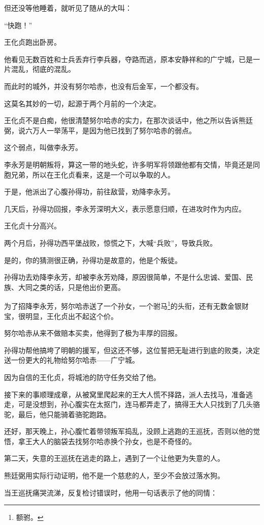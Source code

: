 \begin{multicols}{\theparacolNo}
但还没等他睡着，就听见了随从的大叫：

“快跑！”

王化贞跑出卧房。

他看见无数百姓和士兵丢弃行李兵器，夺路而逃，原本安静祥和的广宁城，已是一片混乱，彻底的混乱。

而此时的城外，并没有努尔哈赤，也没有后金军，一个都没有。

这莫名其妙的一切，起源于两个月前的一个决定。

王化贞不是白痴，他很清楚努尔哈赤的实力，在那次谈话中，他之所以告诉熊廷弼，说六万人一举荡平，是因为他已找到了努尔哈赤的弱点。

这个弱点，叫做李永芳。

李永芳是明朝叛将，算这一带的地头蛇，许多明军将领跟他都有交情，毕竟还是同胞兄弟，所以在王化贞看来，这是一个可以争取的人。

于是，他派出了心腹孙得功，前往敌营，劝降李永芳。

几天后，孙得功回报，李永芳深明大义，表示愿意归顺，在进攻时作为内应。

王化贞十分高兴。

两个月后，孙得功西平堡战败，惊慌之下，大喊“兵败”，导致兵败。

是的，你的猜测很正确，孙得功是故意的，他是个叛徒。

孙得功去劝降李永芳，却被李永芳劝降，原因很简单，不是什么忠诚、爱国、民族、大同之类的话，只是他出价更高。

为了招降李永芳，努尔哈赤送了一个孙女，一个驸马\footnote{额驸。}的头衔，还有无数金银财宝，很明显，王化贞出不起这个价。

努尔哈赤从来不做赔本买卖，他得到了极为丰厚的回报。

孙得功帮他搞垮了明朝的援军，但这还不够，这位誓把无耻进行到底的败类，决定送一份更大的礼物给努尔哈赤——广宁城。

因为自信的王化贞，将城池的防守任务交给了他。

接下来的事顺理成章，从被窝里爬起来的王大人慌不择路，派人去找马，准备逃走，可是没想到，孙心腹实在太抠门，连马都弄走了，搞得王大人只找到了几头骆驼，最后，他只能骑着骆驼跑路。

还好，那天晚上，孙心腹忙着带领叛军捣乱，没顾上逃跑的王巡抚，否则以他的觉悟，拿王大人的脑袋去找努尔哈赤换个孙女，也是不奇怪的。

第二天，失意的王巡抚在逃走的路上，遇到了一个让他更为失意的人。

熊廷弼用实际行动证明，他不是一个慈悲的人，至少不会放过落水狗。

当王巡抚痛哭流涕，反复检讨错误时，他用一句话表示了他的同情：


\end{multicols}
